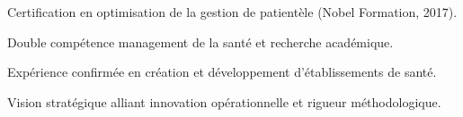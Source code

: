 \begin{cvskills}
\end{cvskills}


\begin{cventries}
  \cventry
    {}
    {}
    {}
    {}
    {
      \begin{cvitems}
        \item Certification en optimisation de la gestion de patientèle (Nobel Formation, 2017).
        \item Double compétence management de la santé et recherche académique.
        \item Expérience confirmée en création et développement d'établissements de santé.
        \item Vision stratégique alliant innovation opérationnelle et rigueur méthodologique.
      \end{cvitems}
    }
\end{cventries}
